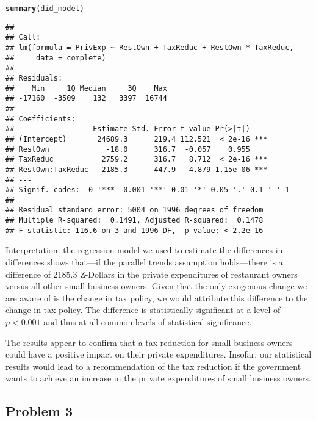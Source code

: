 \documentclass[12pt]{article}\usepackage[]{graphicx}\usepackage[]{color}
\makeatletter
\newcommand{\hlstd}[1]{\textcolor[rgb]{0.345,0.345,0.345}{#1}}%
\newcommand{\hlkwd}[1]{\textcolor[rgb]{0.737,0.353,0.396}{\textbf{#1}}}%
\newenvironment{kframe}{%
 \def\at@end@of@kframe{}%
 \ifinner\ifhmode%
  \def\at@end@of@kframe{\end{minipage}}%
  \begin{minipage}{\columnwidth}%
 \fi\fi%
 \def\FrameCommand##1{\hskip\@totalleftmargin \hskip-\fboxsep
 \colorbox{shadecolor}{##1}\hskip-\fboxsep
     \hskip-\linewidth \hskip-\@totalleftmargin \hskip\columnwidth}%
 \MakeFramed {\advance\hsize-\width
   \@totalleftmargin\z@ \linewidth\hsize
   \@setminipage}}%
 {\par\unskip\endMakeFramed%
 \at@end@of@kframe}
\newenvironment{knitrout}{}{} %
\makeatother
\begin{document}
\begin{knitrout}
\begin{kframe}
\begin{alltt}
\hlkwd{summary}\hlstd{(did_model)}
\end{alltt}
\begin{verbatim}
## 
## Call:
## lm(formula = PrivExp ~ RestOwn + TaxReduc + RestOwn * TaxReduc, 
##     data = complete)
## 
## Residuals:
##    Min     1Q Median     3Q    Max 
## -17160  -3509    132   3397  16744 
## 
## Coefficients:
##                  Estimate Std. Error t value Pr(>|t|)    
## (Intercept)       24689.3      219.4 112.521  < 2e-16 ***
## RestOwn             -18.0      316.7  -0.057    0.955    
## TaxReduc           2759.2      316.7   8.712  < 2e-16 ***
## RestOwn:TaxReduc   2185.3      447.9   4.879 1.15e-06 ***
## ---
## Signif. codes:  0 '***' 0.001 '**' 0.01 '*' 0.05 '.' 0.1 ' ' 1
## 
## Residual standard error: 5004 on 1996 degrees of freedom
## Multiple R-squared:  0.1491,	Adjusted R-squared:  0.1478 
## F-statistic: 116.6 on 3 and 1996 DF,  p-value: < 2.2e-16
\end{verbatim}
\end{kframe}
\end{knitrout}

Interpretation: the regression model we used to estimate the differences-in-differences shows that---if the parallel trends assumption holds---there is a difference of 2185.3 Z-Dollars in the private expenditures of restaurant owners versus all other small business owners. Given that the only exogenous change we are aware of is the change in tax policy, we would attribute this difference to the change in tax policy. The difference is statistically significant at a level of $p < 0.001$ and thus at all common levels of statistical significance.

The results appear to confirm that a tax reduction for small business owners could have a positive impact on their private expenditures. Insofar, our statistical results would lead to a recommendation of the tax reduction if the government wants to achieve an increase in the private expenditures of small business owners.



\subsection*{Problem 3}
\end{document}
